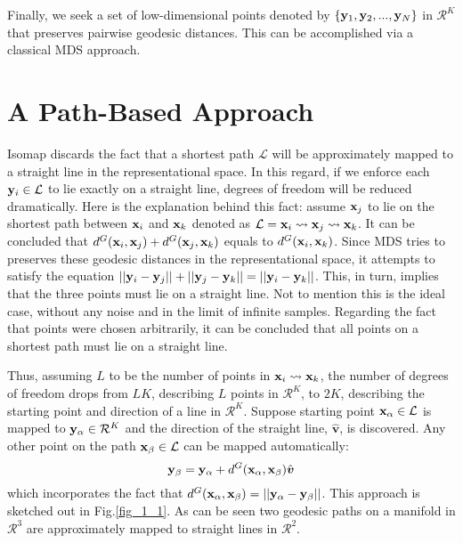 \documentclass[10pt,journal,cspaper,compsoc]{IEEEtran}
\begin{document}
Finally, we seek a set of low-dimensional points denoted by $\left\{{\bf y}_1,{\bf y}_2,...,{\bf y}_N\right\}$ in $\mathcal{R}^K$ that preserves pairwise geodesic distances. This can be accomplished via a classical MDS approach.



\section{A Path-Based Approach}
Isomap discards the fact that a shortest path $\mathcal{L}$ will be approximately mapped to a straight line in the representational space. In this regard, if we enforce each ${\bf y}_i \in \mathcal{L}$ to lie exactly on a straight line, degrees of freedom will be reduced dramatically. Here is the explanation behind this fact: assume ${\bf x}_j$ to lie on the shortest path between ${\bf x}_i$ and ${\bf x}_k$ denoted as $\mathcal{L}={\bf x}_i \leadsto {\bf x}_j \leadsto {\bf x}_k$. It can be concluded that $d^G({\bf x}_i,{\bf x}_j)+d^G({\bf x}_j,{\bf x}_k)$ equals to $d^G({\bf x}_i,{\bf x}_k)$. Since MDS tries to preserves these geodesic distances in the representational space, it attempts to satisfy the equation $||{\bf y}_i-{\bf y}_j||+ ||{\bf y}_j-{\bf y}_k||=||{\bf y}_i-{\bf y}_k||$. This, in turn, implies that the three points must lie on a straight line. Not to mention this is the ideal case, without any noise and in the limit of infinite samples. Regarding the fact that points were chosen arbitrarily, it can be concluded that all points on a shortest path must lie on a straight line. 

Thus, assuming $L$ to be the number of points in ${\bf x}_i \leadsto {\bf x}_k$, the number of degrees of freedom drops from $L K$, describing $L$ points in $\mathcal{R}^K$, to $2 K$, describing the starting point and direction of a line in $\mathcal{R}^K$. Suppose starting point ${\bf x}_{\alpha} \in \mathcal{L}$ is mapped to ${\bf y}_{\alpha} \in \mathcal{R}^K$ and the direction of the straight line, $\hat{\boldsymbol{v}}$, is discovered. Any other point on the path ${\bf x}_{\beta} \in \mathcal{L}$ can be mapped automatically: 
\begin{equation}
\label{eq1}
{\bf y}_{\beta} = {\bf y}_{\alpha}+d^G({\bf x}_{\alpha},{\bf x}_{\beta})\hat{\boldsymbol{v}}
\end{equation}
which incorporates the fact that $d^G({\bf x}_{\alpha},{\bf x}_{\beta})=||{\bf y}_{\alpha}-{\bf y}_{\beta}||$. This approach is sketched out in Fig.\ref{fig_1_1}. As can be seen two geodesic paths on a manifold in $\mathcal{R}^3$ are approximately mapped to straight lines in $\mathcal{R}^2$.
\end{document}
